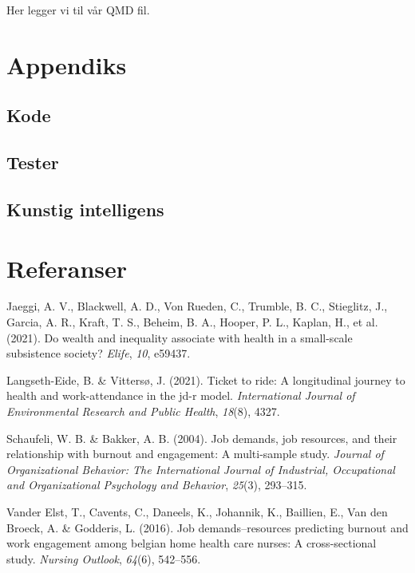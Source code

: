 \documentclass[
  12pt,
  a4paper,
  DIV=11,
  numbers=noendperiod]{scrartcl}
\newlength{\cslhangindent}
\newenvironment{CSLReferences}[2] %
 {\begin{list}{}{%
  \setlength{\itemindent}{0pt}
  \setlength{\leftmargin}{0pt}
  \setlength{\parsep}{0pt}
  \ifodd #1
   \setlength{\leftmargin}{\cslhangindent}
   \setlength{\itemindent}{-1\cslhangindent}
  \fi
  \setlength{\itemsep}{#2\baselineskip}}}
 {\end{list}}
\begin{document}
Her legger vi til vår QMD fil.

\section{Appendiks}\label{appendiks}

\subsection{Kode}\label{kode}

\subsection{Tester}\label{tester}

\subsection{Kunstig intelligens}\label{kunstig-intelligens}

\newpage

\clearpage

\section{Referanser}\label{referanser}

\label{refs}
\begin{CSLReferences}{1}{0}
Jaeggi, A. V., Blackwell, A. D., Von Rueden, C., Trumble, B. C.,
Stieglitz, J., Garcia, A. R., Kraft, T. S., Beheim, B. A., Hooper, P.
L., Kaplan, H., et al. (2021). Do wealth and inequality associate with
health in a small-scale subsistence society? \emph{Elife}, \emph{10},
e59437.

Langseth-Eide, B. \& Vittersø, J. (2021). Ticket to ride: A longitudinal
journey to health and work-attendance in the jd-r model.
\emph{International Journal of Environmental Research and Public
Health}, \emph{18}(8), 4327.

Schaufeli, W. B. \& Bakker, A. B. (2004). Job demands, job resources,
and their relationship with burnout and engagement: A multi-sample
study. \emph{Journal of Organizational Behavior: The International
Journal of Industrial, Occupational and Organizational Psychology and
Behavior}, \emph{25}(3), 293--315.

Vander Elst, T., Cavents, C., Daneels, K., Johannik, K., Baillien, E.,
Van den Broeck, A. \& Godderis, L. (2016). Job demands--resources
predicting burnout and work engagement among belgian home health care
nurses: A cross-sectional study. \emph{Nursing Outlook}, \emph{64}(6),
542--556.

\end{CSLReferences}
\end{document}
